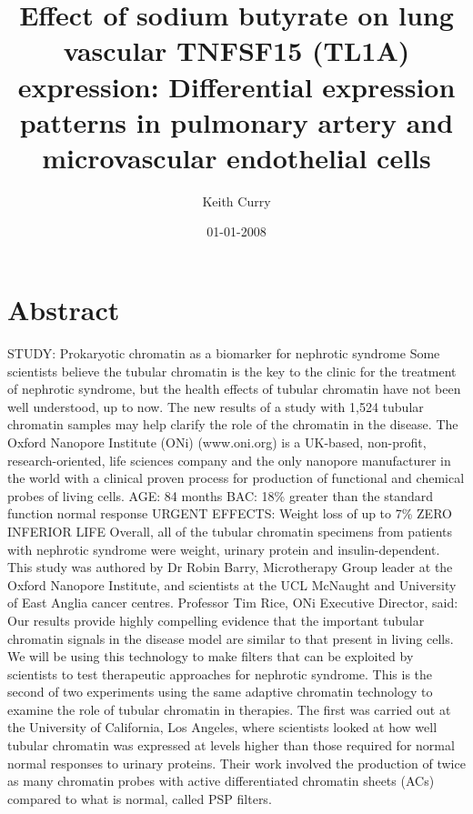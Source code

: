 \documentclass{article}%
\title{Effect of sodium butyrate on lung vascular TNFSF15 (TL1A) expression: Differential expression patterns in pulmonary artery and microvascular endothelial cells}%
\author{Keith Curry}%
\affil{Department of Comparative Physiology, Uppsala University, Uppsala, Sweden}%
\date{01{-}01{-}2008}%
\begin{document}
%
\normalsize%
\maketitle%
\section{Abstract}%
\label{sec:Abstract}%
STUDY: Prokaryotic chromatin as a biomarker for nephrotic syndrome\newline%
Some scientists believe the tubular chromatin is the key to the clinic for the treatment of nephrotic syndrome, but the health effects of tubular chromatin have not been well understood, up to now. The new results of a study with 1,524 tubular chromatin samples may help clarify the role of the chromatin in the disease.\newline%
The Oxford Nanopore Institute (ONi) (www.oni.org) is a UK{-}based, non{-}profit, research{-}oriented, life sciences company and the only nanopore manufacturer in the world with a clinical proven process for production of functional and chemical probes of living cells.\newline%
AGE: 84 months\newline%
BAC: 18\% greater than the standard function normal response\newline%
URGENT EFFECTS: Weight loss of up to 7\%\newline%
ZERO INFERIOR LIFE\newline%
Overall, all of the tubular chromatin specimens from patients with nephrotic syndrome were weight, urinary protein and insulin{-}dependent.\newline%
This study was authored by Dr Robin Barry, Microtherapy Group leader at the Oxford Nanopore Institute, and scientists at the UCL McNaught and University of East Anglia cancer centres.\newline%
Professor Tim Rice, ONi Executive Director, said:\newline%
Our results provide highly compelling evidence that the important tubular chromatin signals in the disease model are similar to that present in living cells. We will be using this technology to make filters that can be exploited by scientists to test therapeutic approaches for nephrotic syndrome.\newline%
This is the second of two experiments using the same adaptive chromatin technology to examine the role of tubular chromatin in therapies. The first was carried out at the University of California, Los Angeles, where scientists looked at how well tubular chromatin was expressed at levels higher than those required for normal normal responses to urinary proteins. Their work involved the production of twice as many chromatin probes with active differentiated chromatin sheets (ACs) compared to what is normal, called PSP filters.\newline%
\end{document}
